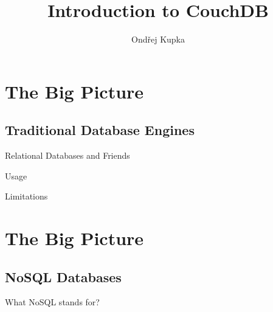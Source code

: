 \documentclass{beamer}
\title{Introduction to CouchDB}
\author{Ondřej Kupka}
\begin{document}
\begin{frame}
\titlepage
\end{frame}

\section{The Big Picture}
\subsection{Traditional Database Engines}
\begin{frame}{Relational Databases and Friends}
\end{frame}

\begin{frame}{Usage}
\end{frame}

\begin{frame}{Limitations}
\end{frame}

\section{The Big Picture}
\subsection{NoSQL Databases}
\begin{frame}{What NoSQL stands for?}
\end{frame}
\end{document}
